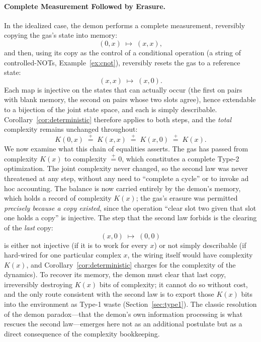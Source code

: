 \documentclass[11pt]{article}
\newcommand{\peq}{\mathrel{\stackrel{+}{=}}}
\begin{document}
\paragraph{Complete Measurement Followed by Erasure.} In the idealized case, the demon performs a complete measurement, reversibly copying the gas's state into memory:
\[
(0, x) \;\mapsto\; (x, x),
\]
and then, using its copy as the control of a conditional operation (a string of controlled-NOTs, Example~\ref{ex:cnot}), reversibly resets the gas to a reference state:
\[
(x, x) \;\mapsto\; (x, 0).
\]
Each map is injective on the states that can actually occur (the first on pairs with blank memory, the second on pairs whose two slots agree), hence extendable to a bijection of the joint state space, and each is simply describable. Corollary~\ref{cor:deterministic} therefore applies to both steps, and the \emph{total} complexity remains unchanged throughout:
\[
K(0, x) \;\peq\; K(x, x) \;\peq\; K(x, 0) \;\peq\; K(x).
\]
We now examine what this chain of equalities asserts. The gas has passed from complexity $K(x)$ to complexity $\peq 0$, which constitutes a complete Type-2 optimization. The joint complexity never changed, so the second law was never threatened at any step, without any need to ``complete a cycle'' or to invoke ad hoc accounting. The balance is now carried entirely by the demon's memory, which holds a record of complexity $K(x)$; the gas's erasure was permitted \emph{precisely because a copy existed}, since the operation ``clear slot two given that slot one holds a copy'' is injective. The step that the second law forbids is the clearing of the \emph{last} copy:
\[
(x, 0) \;\mapsto\; (0, 0)
\]
is either not injective (if it is to work for every $x$) or not simply describable (if hard-wired for one particular complex $x$, the wiring itself would have complexity $K(x)$, and Corollary~\ref{cor:deterministic} charges for the complexity of the dynamics). To recover its memory, the demon must clear that last copy, irreversibly destroying $K(x)$ bits of complexity; it cannot do so without cost, and the only route consistent with the second law is to export those $K(x)$ bits into the environment as Type-1 waste (Section~\ref{sec:type1}). The classic resolution of the demon paradox---that the demon's own information processing is what rescues the second law---emerges here not as an additional postulate but as a direct consequence of the complexity bookkeeping.
\end{document}
